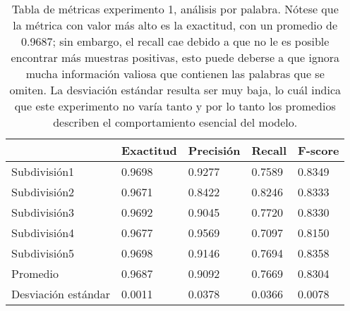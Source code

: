 \begin{table}[h]
    \centering
    \caption{Tabla de métricas experimento 1, análisis por palabra. Nótese que la métrica con valor más alto es la exactitud, con un promedio de 0.9687; sin embargo, el recall cae debido a que no le es posible encontrar más muestras positivas, esto puede deberse a que ignora mucha información valiosa que contienen las palabras que se omiten. La desviación estándar resulta ser muy baja, lo cuál indica que este experimento no varía tanto y por lo tanto los promedios describen el comportamiento esencial del modelo.}
\begin{tabular}{|l|llll|}
\hline
              & Exactitud &     Precisión &     Recall  &   F-score \\ \hline

Subdivisión1            &       0.9698  &       0.9277  &       0.7589  &       0.8349  \\ 
Subdivisión2            &       0.9671  &       0.8422  &       0.8246  &       0.8333  \\ 
Subdivisión3            &       0.9692  &       0.9045  &       0.7720  &       0.8330  \\ 
Subdivisión4            &       0.9677  &       0.9569  &       0.7097  &       0.8150  \\ 
Subdivisión5            &       0.9698  &       0.9146  &       0.7694  &       0.8358  \\ \hline
Promedio                &       0.9687  &       0.9092  &       0.7669  &       0.8304  \\ \hline
Desviación estándar     &       0.0011  &       0.0378  &       0.0366  &       0.0078  \\ \hline

\end{tabular}
		     \label{tab:exp1}
\end{table}